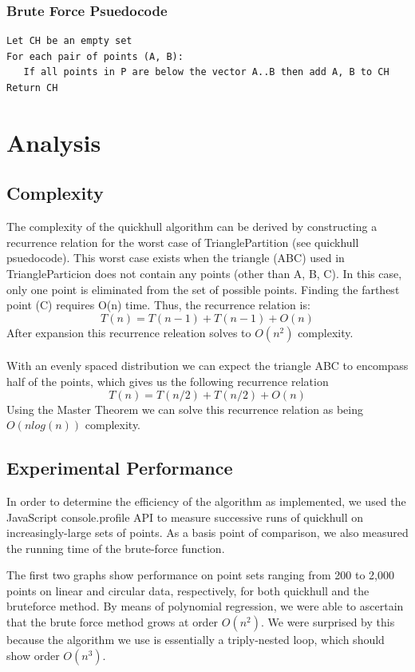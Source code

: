 \documentclass[11pt]{article}
\begin{document}
\subsubsection{Brute Force Psuedocode}
\begin{verbatim}
Let CH be an empty set
For each pair of points (A, B):
   If all points in P are below the vector A..B then add A, B to CH
Return CH
\end{verbatim}

\section{Analysis}

\subsection{Complexity}
The complexity of the quickhull algorithm can be derived by constructing a recurrence relation for the worst case of TrianglePartition (see quickhull psuedocode). This worst case exists when the triangle (ABC) used in TriangleParticion does not contain any points (other than A, B, C). In this case, only one point is eliminated from the set of possible points. Finding the farthest point (C) requires O(n) time. Thus, the recurrence relation is:
\[ T(n) = T(n - 1) + T(n - 1) + O(n) \]
After expansion this recurrence releation solves to $O(n^2)$ complexity\cite{Kent:QH}.
\\
\\
With an evenly spaced distribution we can expect the triangle ABC to encompass half of the points, which gives us the following recurrence relation
\[ T(n) = T(n / 2) + T(n / 2) + O(n) \]
Using the Master Theorem we can solve this recurrence relation as being $O(n log(n))$ complexity\cite{Kent:QH}.

\subsection{Experimental Performance}
In order to determine the efficiency of the algorithm as implemented, we used the JavaScript console.profile API to measure successive runs of quickhull on increasingly-large sets of points. As a basis point of comparison, we also measured the running time of the brute-force function.

The first two graphs show performance on point sets ranging from 200 to 2,000 points on linear and circular data, respectively, for both quickhull and the bruteforce method. By means of polynomial regression, we were able to ascertain that the brute force method grows at order $O(n^2)$. We were surprised by this because the algorithm we use is essentially a triply-nested loop, which should show order $O(n^3)$.
\end{document}
